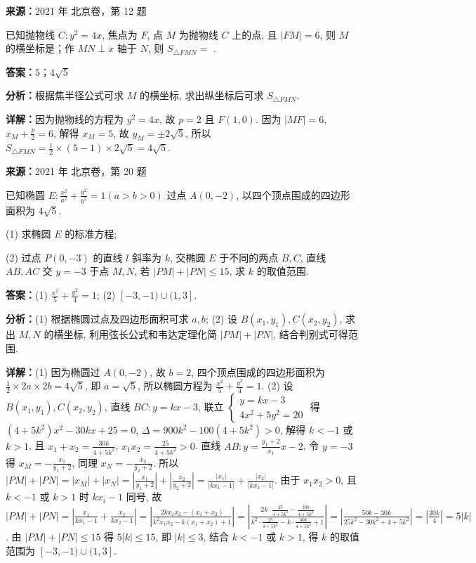 \begin{question}[points=5]
\textbf{来源：}2021 年 北京卷，第 12 题\par
已知抛物线 $C:y^2=4x$, 焦点为 $F$, 点 $M$ 为抛物线 $C$ 上的点, 且 $|FM|=6$, 则 $M$ 的横坐标是；作 $MN\perp x$ 轴于 $N$, 则 $S_{\triangle FMN}=$ .
\fillin[{$5$；$4\sqrt{5}$}]
\begin{solution}
\textbf{答案：}$5$；$4\sqrt{5}$

\textbf{分析：}根据焦半径公式可求 $M$ 的横坐标, 求出纵坐标后可求 $S_{\triangle FMN}$.

\textbf{详解：}因为抛物线的方程为 $y^2=4x$, 故 $p=2$ 且 $F(1,0)$. 因为 $|MF|=6$, $x_M+\frac{p}{2}=6$, 解得 $x_M=5$, 故 $y_M=\pm 2\sqrt{5}$, 所以 $S_{\triangle FMN}=\frac{1}{2}\times(5-1)\times 2\sqrt{5}=4\sqrt{5}$.
\end{solution}
\end{question}

\begin{question}[points=14]
\textbf{来源：}2021 年 北京卷，第 20 题\par
已知椭圆 $E:\frac{x^2}{a^2}+\frac{y^2}{b^2}=1(a>b>0)$ 过点 $A(0,-2)$, 以四个顶点围成的四边形面积为 $4\sqrt{5}$.

(1) 求椭圆 $E$ 的标准方程;

(2) 过点 $P(0,-3)$ 的直线 $l$ 斜率为 $k$, 交椭圆 $E$ 于不同的两点 $B,C$, 直线 $AB,AC$ 交 $y=-3$ 于点 $M,N$, 若 $|PM|+|PN|\leq15$, 求 $k$ 的取值范围.
\begin{solution}
\textbf{答案：}(1) $\frac{x^2}{5}+\frac{y^2}{4}=1$; (2) $[-3,-1)\cup(1,3]$.

\textbf{分析：}(1) 根据椭圆过点及四边形面积可求 $a,b$; (2) 设 $B(x_1,y_1),C(x_2,y_2)$, 求出 $M,N$ 的横坐标, 利用弦长公式和韦达定理化简 $|PM|+|PN|$, 结合判别式可得范围.

\textbf{详解：}(1) 因为椭圆过 $A(0,-2)$, 故 $b=2$, 四个顶点围成的四边形面积为 $\frac{1}{2}\times2a\times2b=4\sqrt{5}$, 即 $a=\sqrt{5}$, 所以椭圆方程为 $\frac{x^2}{5}+\frac{y^2}{4}=1$.
(2) 设 $B(x_1,y_1),C(x_2,y_2)$, 直线 $BC:y=kx-3$, 联立 $\begin{cases} y=kx-3 \\ 4x^2+5y^2=20 \end{cases}$ 得 $(4+5k^2)x^2-30kx+25=0$, $\Delta=900k^2-100(4+5k^2)>0$, 解得 $k<-1$ 或 $k>1$, 且 $x_1+x_2=\frac{30k}{4+5k^2}$, $x_1x_2=\frac{25}{4+5k^2}>0$. 直线 $AB:y=\frac{y_1+2}{x_1}x-2$, 令 $y=-3$ 得 $x_M=-\frac{x_1}{y_1+2}$, 同理 $x_N=-\frac{x_2}{y_2+2}$. 所以 $|PM|+|PN|=|x_M|+|x_N|=\left|\frac{x_1}{y_1+2}\right|+\left|\frac{x_2}{y_2+2}\right|=\frac{|x_1|}{|kx_1-1|}+\frac{|x_2|}{|kx_2-1|}$. 由于 $x_1x_2>0$, 且 $k<-1$ 或 $k>1$ 时 $kx_i-1$ 同号, 故 $|PM|+|PN|=\left|\frac{x_1}{kx_1-1}+\frac{x_2}{kx_2-1}\right|=\left|\frac{2kx_1x_2-(x_1+x_2)}{k^2x_1x_2-k(x_1+x_2)+1}\right|=\left|\frac{2k\cdot\frac{25}{4+5k^2}-\frac{30k}{4+5k^2}}{k^2\cdot\frac{25}{4+5k^2}-k\cdot\frac{30k}{4+5k^2}+1}\right|=\left|\frac{50k-30k}{25k^2-30k^2+4+5k^2}\right|=\left|\frac{20k}{4}\right|=5|k|$. 由 $|PM|+|PN|\leq15$ 得 $5|k|\leq15$, 即 $|k|\leq3$, 结合 $k<-1$ 或 $k>1$, 得 $k$ 的取值范围为 $[-3,-1)\cup(1,3]$.
\end{solution}
\end{question}

